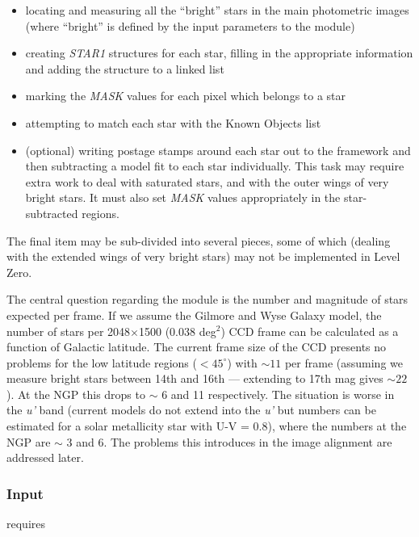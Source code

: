 \begin{itemize}
  \item locating and measuring all the ``bright'' stars in the main 
        photometric images (where ``bright'' is defined by the
        input parameters to the module)
  \item creating {\it STAR1} structures for each star, filling in
        the appropriate information and adding the structure to 
        a linked list 
  \item marking the {\it MASK} values for each pixel which belongs
        to a star
  \item attempting to match each star with the Known Objects list
  \item (optional) writing postage stamps around each star out to
        the framework and then subtracting a model fit to each
        star individually.  This task may require extra work to deal
        with saturated stars, and with the outer wings of very bright
        stars.  It must also set {\it MASK} values appropriately in
        the star-subtracted regions.
        
\end{itemize}

  The final item may be sub-divided into several pieces, some of which
(dealing with the extended wings of very bright stars) may not be
implemented in Level Zero.

The central question regarding the \fbs module is the number and
magnitude of stars expected per frame. If we assume the Gilmore and Wyse
Galaxy model, the number of stars per 2048$\times$1500 (0.038 deg$^2$) CCD
frame can be calculated as a function of Galactic latitude. 
The current frame size of the CCD presents no problems for 
the low latitude regions ($<45^\circ$) 
with $\sim 11$ per frame (assuming we 
measure bright stars between 14th and 16th --- extending to 17th mag 
gives $\sim 22$).
At the NGP this drops to $\sim$ 6 and 11 respectively. The situation is worse
in the {\it u'} band (current models do not extend into the 
{\it u'} but numbers can be
estimated for a solar metallicity star with U-V = 0.8), 
where the numbers at the
NGP are $\sim$ 3 and 6. The problems this introduces in the image alignment
are addressed later.

\subsubsection{Input}

  \fbs requires

